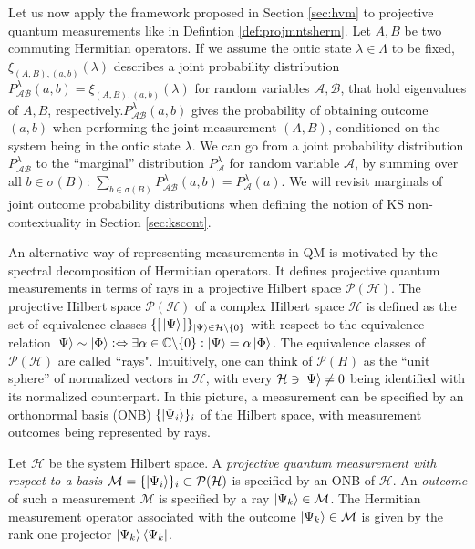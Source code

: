 Let us now apply the framework proposed in Section \ref{sec:hvm} to projective quantum measurements like in Defintion \ref{def:projmntsherm}. Let $A,B$ be two commuting Hermitian operators. If we assume the ontic state $\lambda\in\Lambda$ to be fixed, $\xi_{(A,B),(a,b)}(\lambda)$ describes a joint probability distribution $P_{\mathcal{A}\mathcal{B}}^{\lambda}(a,b)=\xi_{(A,B),(a,b)}(\lambda)$ for random variables $\mathcal{A},\mathcal{B}$, that hold eigenvalues of $A,B$, respectively.\hfill\break $P_{\mathcal{A}\mathcal{B}}^{\lambda}(a,b)$ gives the probability of obtaining outcome $(a,b)$ when performing the joint measurement $(A,B)$, conditioned on the system being in the ontic state $\lambda$. We can go from a joint probability distribution $P_{\mathcal{A}\mathcal{B}}^{\lambda}$ to the “marginal” distribution $P_{\mathcal{A}}^{\lambda}$ for random variable $\mathcal{A}$, by summing over all $b\in\sigma(B)$: $\sum_{b\in\sigma(B)}P_{\mathcal{A}\mathcal{B}}^{\lambda}(a,b)=P_{\mathcal{A}}^{\lambda}(a)$. We will revisit marginals of joint outcome probability distributions when defining the notion of KS non-contextuality in Section \ref{sec:kscont}.

An alternative way of representing measurements in QM is motivated by the spectral decomposition of Hermitian operators. It defines projective quantum measurements in terms of rays in a projective Hilbert space $\mathcal{P}(\mathcal{H})$. The projective Hilbert space $\mathcal{P}(\mathcal{H})$ of a complex Hilbert space $\mathcal{H}$ is defined as the set of equivalence classes $\{[\thinspace\ket{\Psi}\thinspace]\}_{\ket{\Psi} \in\mathcal{H}\backslash\{0\}}$ with respect to the equivalence relation $\ket{\Psi}\sim\ket{\Phi} \mathrel{\vcentcolon\Leftrightarrow}\exists\alpha\in\mathbb{C\backslash}\{0\}\vcentcolon\ket{\Psi} =\alpha\ket{\Phi}$. The equivalence classes of $\mathcal{P}(\mathcal{H})$ are called ``rays". Intuitively, one can think of $\mathcal{P}(H)$ as the ``unit sphere” of normalized vectors in $\mathcal{H}$, with every $\mathcal{H}\ni\ket{\Psi}\neq0$ being identified with its normalized counterpart. In this picture, a measurement can be specified by an orthonormal basis (ONB) $\{\ket{\Psi_{i}} \}_{i}$ of the Hilbert space, with measurement outcomes being represented by rays.

\begin{definition}
\label{def:projmntsbasis}
Let $\mathcal{H}$ be the system Hilbert space.\hfill\break
A \emph{projective quantum measurement with respect to a basis} $\mathcal{M}=\{\ket{\Psi_{i}} \}_{i}\subset\mathcal{\mathcal{P}}(\mathcal{H})$ is specified by an ONB of $\mathcal{H}$. An \emph{outcome} of such a measurement $\mathcal{M}$ is specified by a ray $\ket{\Psi_{k}} \in\mathcal{M}$. The Hermitian measurement operator associated with the outcome $\ket{\Psi_{k}} \in\mathcal{M}$ is given by the rank one projector $\ket{\Psi_{k}}\bra{\Psi_{k}}$.
\end{definition}

